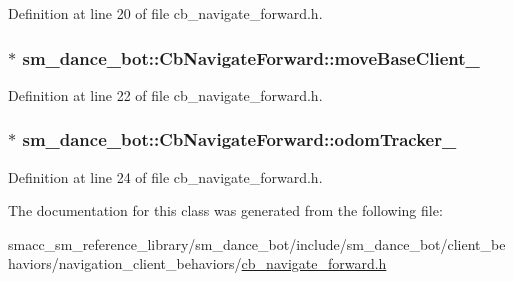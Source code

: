 Definition at line 20 of file cb\+\_\+navigate\+\_\+forward.\+h.

\subsubsection[{\texorpdfstring{move\+Base\+Client\+\_\+}{moveBaseClient_}}]{$\ast$ sm\+\_\+dance\+\_\+bot\+::\+Cb\+Navigate\+Forward\+::move\+Base\+Client\+\_\+}\hypertarget{classsm__dance__bot_1_1CbNavigateForward_aa1cd872e92fca83c44ff0430bda061a7}{}\label{classsm__dance__bot_1_1CbNavigateForward_aa1cd872e92fca83c44ff0430bda061a7}


Definition at line 22 of file cb\+\_\+navigate\+\_\+forward.\+h.

\subsubsection[{\texorpdfstring{odom\+Tracker\+\_\+}{odomTracker_}}]{$\ast$ sm\+\_\+dance\+\_\+bot\+::\+Cb\+Navigate\+Forward\+::odom\+Tracker\+\_\+}\hypertarget{classsm__dance__bot_1_1CbNavigateForward_acaa4978c23fbc57fee5ee13a12842e7d}{}\label{classsm__dance__bot_1_1CbNavigateForward_acaa4978c23fbc57fee5ee13a12842e7d}


Definition at line 24 of file cb\+\_\+navigate\+\_\+forward.\+h.



The documentation for this class was generated from the following file\+:\begin{DoxyCompactItemize}
\item 
smacc\+\_\+sm\+\_\+reference\+\_\+library/sm\+\_\+dance\+\_\+bot/include/sm\+\_\+dance\+\_\+bot/client\+\_\+behaviors/navigation\+\_\+client\+\_\+behaviors/\hyperlink{cb__navigate__forward_8h}{cb\+\_\+navigate\+\_\+forward.\+h}\end{DoxyCompactItemize}
